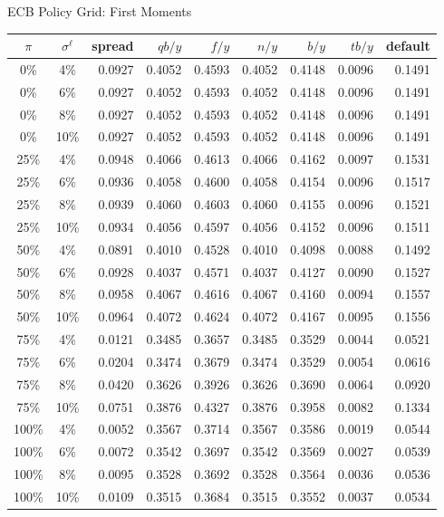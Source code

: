 
\begin{frame}{ECB Policy Grid: First Moments}
\hypertarget{policy-first}{}
\fontsize{6.5pt}{7.2pt}\selectfont
\centering
\begin{tabular}{ccrrrrrrr}
\toprule
$\pi$ & $\sigma^\ell$ & spread & $qb/y$ & $f/y$ & $n/y$ & $b/y$ & $tb/y$ & default \\
\midrule
0\%   & 4\%  & 0.0927 & 0.4052 & 0.4593 & 0.4052 & 0.4148 & 0.0096 & 0.1491 \\
0\%   & 6\%  & 0.0927 & 0.4052 & 0.4593 & 0.4052 & 0.4148 & 0.0096 & 0.1491 \\
0\%   & 8\%  & 0.0927 & 0.4052 & 0.4593 & 0.4052 & 0.4148 & 0.0096 & 0.1491 \\
0\%   & 10\% & 0.0927 & 0.4052 & 0.4593 & 0.4052 & 0.4148 & 0.0096 & 0.1491 \\
\midrule
25\%  & 4\%  & 0.0948 & 0.4066 & 0.4613 & 0.4066 & 0.4162 & 0.0097 & 0.1531 \\
25\%  & 6\%  & 0.0936 & 0.4058 & 0.4600 & 0.4058 & 0.4154 & 0.0096 & 0.1517 \\
25\%  & 8\%  & 0.0939 & 0.4060 & 0.4603 & 0.4060 & 0.4155 & 0.0096 & 0.1521 \\
25\%  & 10\% & 0.0934 & 0.4056 & 0.4597 & 0.4056 & 0.4152 & 0.0096 & 0.1511 \\
\midrule
50\%  & 4\%  & 0.0891 & 0.4010 & 0.4528 & 0.4010 & 0.4098 & 0.0088 & 0.1492 \\
50\%  & 6\%  & 0.0928 & 0.4037 & 0.4571 & 0.4037 & 0.4127 & 0.0090 & 0.1527 \\
50\%  & 8\%  & 0.0958 & 0.4067 & 0.4616 & 0.4067 & 0.4160 & 0.0094 & 0.1557 \\
50\%  & 10\% & 0.0964 & 0.4072 & 0.4624 & 0.4072 & 0.4167 & 0.0095 & 0.1556 \\
\midrule
75\%  & 4\%  & 0.0121 & 0.3485 & 0.3657 & 0.3485 & 0.3529 & 0.0044 & 0.0521 \\
75\%  & 6\%  & 0.0204 & 0.3474 & 0.3679 & 0.3474 & 0.3529 & 0.0054 & 0.0616 \\
75\%  & 8\%  & 0.0420 & 0.3626 & 0.3926 & 0.3626 & 0.3690 & 0.0064 & 0.0920 \\
75\%  & 10\% & 0.0751 & 0.3876 & 0.4327 & 0.3876 & 0.3958 & 0.0082 & 0.1334 \\
\midrule
100\% & 4\%  & 0.0052 & 0.3567 & 0.3714 & 0.3567 & 0.3586 & 0.0019 & 0.0544 \\
100\% & 6\%  & 0.0072 & 0.3542 & 0.3697 & 0.3542 & 0.3569 & 0.0027 & 0.0539 \\
100\% & 8\%  & 0.0095 & 0.3528 & 0.3692 & 0.3528 & 0.3564 & 0.0036 & 0.0536 \\
100\% & 10\% & 0.0109 & 0.3515 & 0.3684 & 0.3515 & 0.3552 & 0.0037 & 0.0534 \\
\bottomrule
\end{tabular}


\end{frame}
